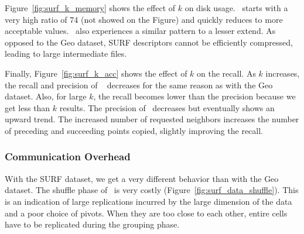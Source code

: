 Figure~\ref{fig:surf_k_memory} shows the effect of $k$ on disk usage. \Z~starts with a very high ratio of 74 
(not showed on the Figure) and 
quickly reduces to more acceptable values. 
 \LSH~also experiences a similar pattern to a lesser extend. As opposed to the Geo dataset, SURF 
descriptors cannot be efficiently compressed, leading to large intermediate files.

Finally, Figure~\ref{fig:surf_k_acc} shows the effect of $k$ on the recall. As $k$ increases, the recall and precision 
of \LSH~ decreases for the same reason as with the Geo dataset. Also, for large $k$, the recall becomes lower
than the precision because we get less than $k$ results. The precision of \Z~decreases but eventually shows an upward 
trend. The increased number of requested neighbors increases the number of preceding and
succeeding points copied, slightly improving the recall.

\subsubsection{Communication Overhead}
With the SURF dataset, we get a very different behavior than with the Geo dataset. The shuffle phase of \VO~is very 
costly (Figure~\ref{fig:surf_data_shuffle}). This is an indication of large replications incurred by the large 
dimension of the data and a poor choice of pivots. When they are too close to each other, entire cells have to be 
replicated during the grouping phase.

